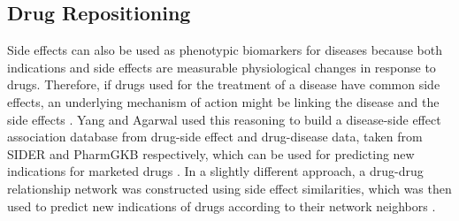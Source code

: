 \subsection{Drug Repositioning}

Side effects can also be used as phenotypic biomarkers for diseases because both indications and side effects are measurable physiological changes in response to drugs.
Therefore, if drugs used for the treatment of a disease have common side effects, an underlying mechanism of action might be linking the disease and the side effects \cite{yang_systematic_2011}.
Yang and Agarwal used this reasoning to build a disease-side effect association database from drug-side effect and drug-disease data, taken from \ac{SIDER} and PharmGKB respectively, which can be used for predicting new indications for marketed drugs \cite{yang_systematic_2011}.
In a slightly different approach, a drug-drug relationship network was constructed using side effect similarities, which was then used to predict new indications of drugs according to their network neighbors \cite{ye_construction_2014}.
